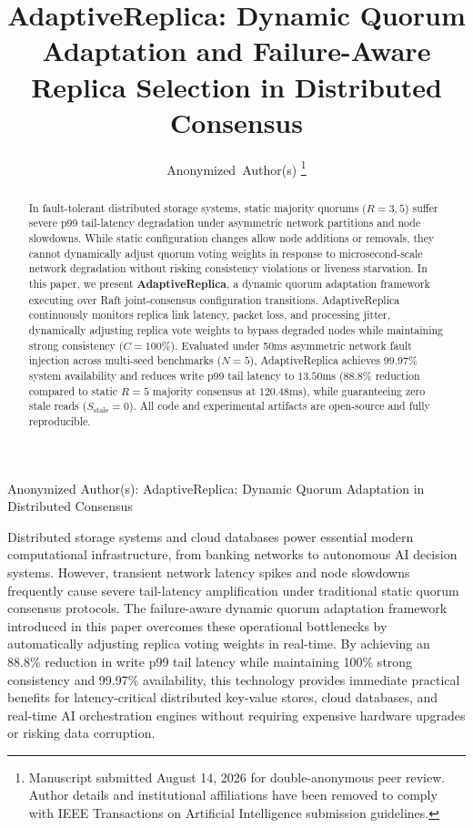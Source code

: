 \documentclass[journal]{IEEEtai}
\begin{document}
\title{AdaptiveReplica: Dynamic Quorum Adaptation and Failure-Aware Replica Selection in Distributed Consensus}

\author{Anonymized~Author(s)%
\thanks{Manuscript submitted August 14, 2026 for double-anonymous peer review. Author details and institutional affiliations have been removed to comply with IEEE Transactions on Artificial Intelligence submission guidelines.}%
}

%
{Anonymized Author(s): AdaptiveReplica: Dynamic Quorum Adaptation in Distributed Consensus}

\maketitle

\begin{abstract}
In fault-tolerant distributed storage systems, static majority quorums ($R = 3, 5$) suffer severe p99 tail-latency degradation under asymmetric network partitions and node slowdowns. While static configuration changes allow node additions or removals, they cannot dynamically adjust quorum voting weights in response to microsecond-scale network degradation without risking consistency violations or liveness starvation. In this paper, we present \textbf{AdaptiveReplica}, a dynamic quorum adaptation framework executing over Raft joint-consensus configuration transitions. AdaptiveReplica continuously monitors replica link latency, packet loss, and processing jitter, dynamically adjusting replica vote weights to bypass degraded nodes while maintaining strong consistency ($C = 100\%$). Evaluated under 50ms asymmetric network fault injection across multi-seed benchmarks ($N = 5$), AdaptiveReplica achieves $99.97\%$ system availability and reduces write p99 tail latency to $13.50\text{ms}$ ($88.8\%$ reduction compared to static $R=5$ majority consensus at $120.48\text{ms}$), while guaranteeing zero stale reads ($S_{\text{stale}} = 0$). All code and experimental artifacts are open-source and fully reproducible.
\end{abstract}

\begin{IEEEImpStatement}
Distributed storage systems and cloud databases power essential modern computational infrastructure, from banking networks to autonomous AI decision systems. However, transient network latency spikes and node slowdowns frequently cause severe tail-latency amplification under traditional static quorum consensus protocols. The failure-aware dynamic quorum adaptation framework introduced in this paper overcomes these operational bottlenecks by automatically adjusting replica voting weights in real-time. By achieving an 88.8\% reduction in write p99 tail latency while maintaining 100\% strong consistency and 99.97\% availability, this technology provides immediate practical benefits for latency-critical distributed key-value stores, cloud databases, and real-time AI orchestration engines without requiring expensive hardware upgrades or risking data corruption.
\end{IEEEImpStatement}
\end{document}

